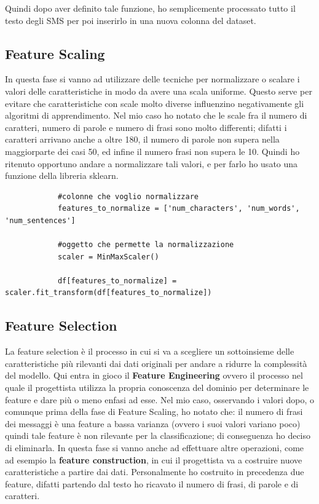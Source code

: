 \documentclass[]{article}
\begin{document}
        Quindi dopo aver definito tale funzione, ho semplicemente processato tutto il testo degli SMS per poi inserirlo in una nuova colonna del dataset.

    \subsection{Feature Scaling}
        In questa fase si vanno ad utilizzare delle tecniche per normalizzare o scalare i valori delle caratteristiche in modo da avere una scala uniforme. Questo serve per evitare che caratteristiche con scale molto diverse influenzino negativamente gli algoritmi di apprendimento. Nel mio caso ho notato che le scale fra il numero di caratteri, numero di parole e numero di frasi sono molto differenti; difatti i caratteri arrivano anche a oltre 180, il numero di parole non supera nella maggiorparte dei casi 50, ed infine il numero frasi non supera le 10. Quindi ho ritenuto opportuno andare a normalizzare tali valori, e per farlo ho usato una funzione della libreria sklearn.
        \begin{verbatim}
            #colonne che voglio normalizzare
            features_to_normalize = ['num_characters', 'num_words', 'num_sentences']

            #oggetto che permette la normalizzazione
            scaler = MinMaxScaler()

            df[features_to_normalize] = scaler.fit_transform(df[features_to_normalize])
        \end{verbatim}

        \subsection{Feature Selection}
            La feature selection è il processo in cui si va a scegliere un sottoinsieme delle caratteristiche più rilevanti dai dati originali per andare a ridurre la complessità del modello. Qui entra in gioco il \textbf{Feature Engineering} ovvero il processo nel quale il progettista utilizza la propria conoscenza del dominio per determinare le feature e dare più o meno enfasi ad esse. Nel mio caso, osservando i valori dopo, o comunque prima della fase di Feature Scaling, ho notato che: il numero di frasi dei messaggi è una feature a bassa varianza (ovvero i suoi valori variano poco) quindi tale feature è non rilevante per la classificazione; di conseguenza ho deciso di eliminarla. In questa fase si vanno anche ad effettuare altre operazioni, come ad esempio la \textbf{feature construction}, in cui il progettista va a costruire nuove caratteristiche a partire dai dati. Personalmente ho costruito in precedenza due feature, difatti partendo dal testo ho ricavato il numero di frasi, di parole e di caratteri.
\end{document}
